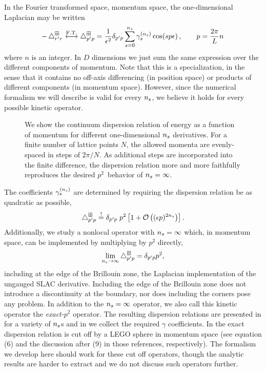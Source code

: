 In the Fourier transformed space, momentum space, the one-dimensional Laplacian may be written
\begin{equation}
    \label{eq:laplacian}
    -\mathop{}\!\mathbin\bigtriangleup_{r'r^{}}^\boxplus
    \overset{\text{F.T.}}{\longleftrightarrow}
    \mathop{}\!\mathbin\bigtriangleup^\boxplus_{p'p}
    =
    \frac{1}{\epsilon^2}
    \delta_{p'p}
    \sum_{s=0}^{{n_s}} \gamma_s^{({n_s})} \cos(s p \epsilon)
    \, , \qquad p = \frac{2 \pi}{L} n \,
\end{equation}
where $n$ is an integer.
In $D$ dimensions we just sum the same expression over the different components of momentum.
Note that this is a specialization, in the sense that it contains no off-axis differencing (in position space) or products of different components (in momentum space).
However, since the numerical formalism we will describe is valid for every ${n_s}$, we believe it holds for every possible kinetic operator.

\begin{figure}
    
    \caption{We show the continuum dispersion relation of energy as a function of momentum for different one-dimensional ${n_s}$ derivatives.  For a finite number of lattice points $N$, the allowed momenta are evenly-spaced in steps of $2\pi/N$.
    As additional steps are incorporated into the finite difference, the dispersion relation more and more faithfully reproduces the desired $p^2$~behavior of ${n_s}=\infty$.
    }
    \label{fig:dispersion relation}
\end{figure}

The coefficients $\gamma_{s}^{({n_s})}$ are determined by requiring the dispersion relation be as quadratic as possible,
\begin{equation}
    \label{eq:gamma determination}
    \mathop{}\!\mathbin\bigtriangleup^\boxplus_{p'p}
    \overset{!}{=}
    \delta_{p'p} \;
    p^2 \left[
        1 + \mathcal{O}\left((\epsilon p)^{2{n_s}}\right)
    \right].
\end{equation}
Additionally, we study a nonlocal operator with ${n_s}=\infty$ which, in momentum space, can be implemented by multiplying by $p^2$ directly,
\begin{equation}
    \lim\limits_{n_s \to \infty}
    \mathop{}\!\mathbin\bigtriangleup^\boxplus_{p'p}
    =
    \delta_{p'p} p^2,
\end{equation}
including at the edge of the Brillouin zone, the Laplacian implementation of the ungauged SLAC derivative.
Including the edge of the Brillouin zone does not introduce a discontinuity at the boundary, nor does including the corners pose any problem.
In addition to the ${n_s}=\infty$ operator, we also call this kinetic operator the \emph{exact-$p^2$} operator.
The resulting dispersion relations are presented in  for a variety of ${n_s}$s and in  we collect the required $\gamma$ coefficients.
In  the exact dispersion relation is cut off by a LEGO sphere in momentum space (see equation (6) and the discussion after (9) in those references, respectively).
The formalism we develop here should work for these cut off operators, though the analytic results are harder to extract and we do not discuss such operators further.


